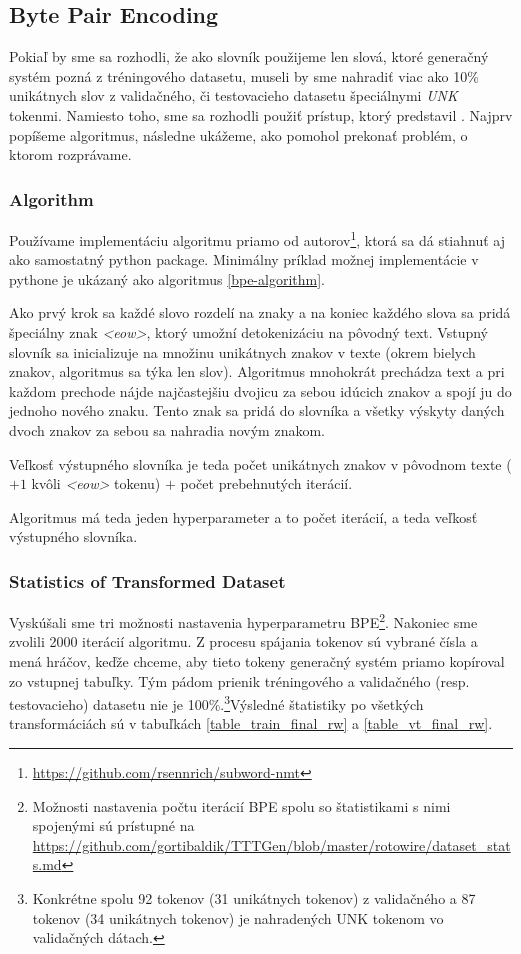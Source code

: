 \subsection{Byte Pair Encoding} \label{bpeSection}

Pokiaľ by sme sa rozhodli, že ako slovník použijeme len slová, ktoré generačný systém pozná z tréningového datasetu, museli by sme nahradiť viac ako 10\% unikátnych slov z validačného, či testovacieho datasetu špeciálnymi \emph{UNK} tokenmi. Namiesto toho, sme sa rozhodli použiť prístup, ktorý predstavil \citep{sennrich2016}. Najprv popíšeme algoritmus, následne ukážeme, ako pomohol prekonať problém, o ktorom rozprávame.

\subsubsection{Algorithm}

Používame implementáciu algoritmu priamo od autorov\footnote{\url{https://github.com/rsennrich/subword-nmt}}, ktorá sa dá stiahnuť aj ako samostatný python package. Minimálny príklad možnej implementácie v pythone je ukázaný ako algoritmus \ref{bpe-algorithm}. 

Ako prvý krok sa každé slovo rozdelí na znaky a na koniec každého slova sa pridá špeciálny znak  \emph{\textless eow\textgreater}, ktorý umožní detokenizáciu na pôvodný text. Vstupný slovník sa inicializuje na množinu unikátnych znakov v texte (okrem bielych znakov, algoritmus sa týka len slov). Algoritmus mnohokrát prechádza text a pri každom prechode nájde najčastejšiu dvojicu za sebou idúcich znakov a spojí ju do jednoho nového znaku. Tento znak sa pridá do slovníka a všetky výskyty daných dvoch znakov za sebou sa nahradia novým znakom. 

Veľkosť výstupného slovníka je teda počet unikátnych znakov v pôvodnom texte ($+1$ kvôli \emph{\textless eow\textgreater} tokenu) $+$ počet prebehnutých iterácií.

Algoritmus má teda jeden hyperparameter a to počet iterácií, a teda veľkosť výstupného slovníka.

\subsubsection{Statistics of Transformed Dataset}

Vyskúšali sme tri možnosti nastavenia hyperparametru BPE\footnote{Možnosti nastavenia počtu iterácií BPE spolu so štatistikami s nimi spojenými sú prístupné na \url{https://github.com/gortibaldik/TTTGen/blob/master/rotowire/dataset_stats.md}}. Nakoniec sme zvolili 2000 iterácií algoritmu. Z procesu spájania tokenov sú vybrané čísla a mená hráčov, keďže chceme, aby tieto tokeny generačný systém priamo kopíroval zo vstupnej tabuľky. Tým pádom prienik tréningového a validačného (resp. testovacieho) datasetu nie je 100\%.\footnote{Konkrétne spolu 92 tokenov (31 unikátnych tokenov) z validačného a 87 tokenov (34 unikátnych tokenov) je nahradených UNK tokenom vo validačných dátach.}Výsledné štatistiky po všetkých transformáciách sú v tabuľkách \ref{table_train_final_rw} a \ref{table_vt_final_rw}.

